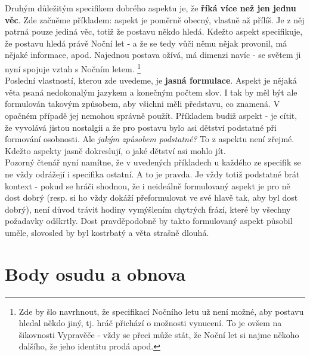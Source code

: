 \documentclass[../main.tex]{subfiles}
\begin{document}
Druhým důležitým specifikem dobrého aspektu je, že \textbf{říká více než jen jednu věc}. Zde začněme příkladem: aspekt  je poměrně obecný, vlastně až přílíš. Je z něj patrná pouze jediná věc, totiž že postavu někdo hledá. Kdežto aspekt  specifikuje, že postavu hledá právě Noční let - a že se tedy vůči němu nějak provonil, má nějaké informace, apod. Najednou postava ožívá, má dimenzi navíc - se světem ji nyní spojuje vztah s Nočním letem. \footnote{Zde by šlo navrhnout, že specifikací Nočního letu už není možné, aby postavu hledal někdo jiný, tj. hráč přichází o možnosti vynucení. To je ovšem na šikovnosti Vypravěče - vždy se přeci může stát, že Noční let si najme někoho dalšího, že jeho identitu prodá apod.}\\

Poslední vlastností, kterou zde uvedeme, je \textbf{jasná formulace}. Aspekt je nějaká věta psaná nedokonalým jazykem a konečným počtem slov. I tak by měl být ale formulován takovým způsobem, aby všichni měli představu, co znamená. V opačném případě jej nemohou správně použít. Příkladem budiž aspekt  - je cítit, že vyvolává jistou nostalgii a že pro postavu bylo asi dětství podstatné při formování osobnosti. Ale \textit{jakým způsobem podstatné?} To z aspektu není zřejmé. Kdežto aspekty  jasně dokreslují, o jaké dětství asi mohlo jít.\\

Pozorný čtenář nyní namítne, že v uvedených příkladech u každého ze specifik se ne vždy odrážejí i specifika ostatní. A to je pravda. Je vždy totiž podstatné brát kontext - pokud se hráči shodnou, že i neideálně formulovaný aspekt je pro ně dost dobrý (resp. si ho vždy dokáží přeformulovat ve své hlavě tak, aby byl dost dobrý), není důvod trávit hodiny vymýšlením chytrých frází, které by všechny požadavky odškrtly. Dost pravděpodobně by takto formulovaný aspekt působil uměle, slovosled by byl kostrbatý a věta strašně dlouhá.

\section{Body osudu a obnova}
\label{sec:body-osudu-obnova}
\end{document}
